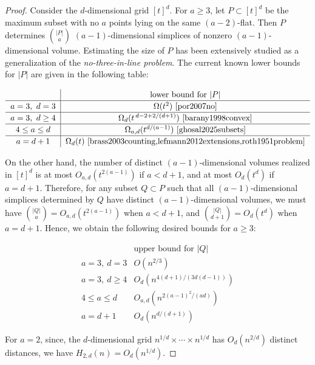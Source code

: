 \documentclass[a4paper,oneside,10pt]{amsart}
\begin{document}
\begin{proof}
Consider the \(d\)-dimensional grid \([t]^d\).
For $a \geq 3$, let \(P\subset [t]^d\) be the maximum subset with no \(a\) points lying on the same \((a-2)\)-flat.
Then \(P\) determines
$
\binom{|P|}{a}
$
\((a-1)\)-dimensional simplices of nonzero \((a-1)\)-dimensional volume.
Estimating the size of \(P\) has been extensively studied as a generalization of the \textit{no-three-in-line problem}.
The current known lower bounds for \(|P|\) are given in the following table:

\[
\renewcommand{\arraystretch}{1.15}
\begin{tabular}{c|c}
 & lower bound for \( |P| \)\\
\hline
\(a=3,\ d=3\) & \(\Omega(t^2)\)~\cite{por2007no}\\
\hline
\(a=3,\ d\geq 4\) & \(\Omega_d (t^{\,d-2+2/(d+1)})\)~\cite{barany1998convex}\\
\hline
\(4\le a\le d\) & \(\Omega_{a,d} (t^{d/(a-1)})\)~\cite{ghosal2025subsets}\\
\hline
\(a=d+1\) & \(\Omega_d (t)\)~\cite{brass2003counting,lefmann2012extensions,roth1951problem}
\end{tabular}
\]

On the other hand, the number of distinct \((a-1)\)-dimensional volumes realized in \([t]^d\) is at most
$
O_{a,d}\!\left(t^{2(a-1)}\right)
$
if 
$a<d+1$,
and at most
$
O_d(t^d)
$
if 
$a=d+1$.
Therefore, for any subset \(Q\subset P\) such that all \((a-1)\)-dimensional simplices determined by \(Q\) have distinct \((a-1)\)-dimensional volumes, we must have
$
\binom{|Q|}{a}=O_{a,d}\!\left(t^{2(a-1)}\right)
$
when \(a<d+1\), and
$
\binom{|Q|}{d+1}=O_d(t^d)
$
when \(a=d+1\).
Hence, we obtain the following desired bounds for $a\geq 3$:

\[
\renewcommand{\arraystretch}{1.2}
\begin{array}{c|c}
& \text{upper bound for } |Q| \\
\hline
a=3,\ d=3 & O(n^{2/3}) \\
\hline
a=3,\ d\ge 4 & O_d\!\left(n^{4(d+1)/(3d(d-1))}\right) \\
\hline
4\le a\le d & O_{a,d}\!\left(n^{2(a-1)^2/(ad)}\right) \\
\hline
a=d+1 & O_d\!\left(n^{d/(d+1)}\right)
\end{array}
\]

For $a=2$, since, the $d$-dimensional grid $n^{1/d} \times \cdots \times n^{1/d}$ has $O_d (n^{2/d})$ distinct distances, we have $H_{2,d} (n) = O_d (n^{1/d})$.
\end{proof}
\end{document}
